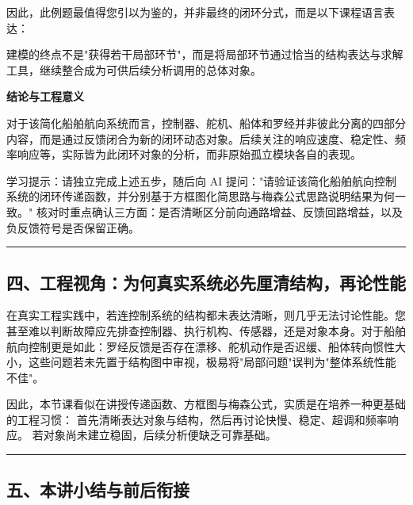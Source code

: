 \documentclass[
  11pt]{article}
\renewenvironment{quote}
  {\begin{HandoutQuoteBox}\small\color{TitleBlue}\noindent\ignorespaces}
  {\end{HandoutQuoteBox}}
\begin{document}
因此，此例题最值得您引以为鉴的，并非最终的闭环分式，而是以下课程语言表达：

\begin{quote}
建模的终点不是"获得若干局部环节"，而是将局部环节通过恰当的结构表达与求解工具，继续整合成为可供后续分析调用的总体对象。
\end{quote}

\textbf{结论与工程意义}

对于该简化船舶航向系统而言，控制器、舵机、船体和罗经并非彼此分离的四部分内容，而是通过反馈闭合为新的闭环动态对象。后续关注的响应速度、稳定性、频率响应等，实际皆为此闭环对象的分析，而非原始孤立模块各自的表现。

学习提示：请独立完成上述五步，随后向 AI
提问："请验证该简化船舶航向控制系统的闭环传递函数，并分别基于方框图化简思路与梅森公式思路说明结果为何一致。"
核对时重点确认三方面：是否清晰区分前向通路增益、反馈回路增益，以及负反馈符号是否保留正确。

\begin{center}\rule{0.5\linewidth}{0.5pt}\end{center}

\subsection{四、工程视角：为何真实系统必先厘清结构，再论性能}\label{ux56dbux5de5ux7a0bux89c6ux89d2ux4e3aux4f55ux771fux5b9eux7cfbux7edfux5fc5ux5148ux5398ux6e05ux7ed3ux6784ux518dux8bbaux6027ux80fd}

在真实工程实践中，若连控制系统的结构都未表达清晰，则几乎无法讨论性能。您甚至难以判断故障应先排查控制器、执行机构、传感器，还是对象本身。对于船舶航向控制更是如此：罗经反馈是否存在漂移、舵机动作是否迟缓、船体转向惯性大小，这些问题若未先置于结构图中审视，极易将"局部问题"误判为"整体系统性能不佳"。

因此，本节课看似在讲授传递函数、方框图与梅森公式，实质是在培养一种更基础的工程习惯：
首先清晰表达对象与结构，然后再讨论快慢、稳定、超调和频率响应。
若对象尚未建立稳固，后续分析便缺乏可靠基础。

\begin{center}\rule{0.5\linewidth}{0.5pt}\end{center}

\subsection{五、本讲小结与前后衔接}\label{ux4e94ux672cux8bb2ux5c0fux7ed3ux4e0eux524dux540eux8854ux63a5}
\end{document}
